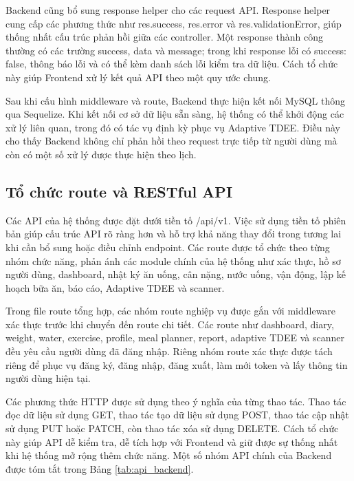 \documentclass[12pt, a4paper]{report}
\begin{document}
Backend cũng bổ sung response helper cho các request API. Response helper cung cấp các phương thức như res.success, res.error và res.validationError, giúp thống nhất cấu trúc phản hồi giữa các controller. Một response thành công thường có các trường success, data và message; trong khi response lỗi có success: false, thông báo lỗi và có thể kèm danh sách lỗi kiểm tra dữ liệu. Cách tổ chức này giúp Frontend xử lý kết quả API theo một quy ước chung.

Sau khi cấu hình middleware và route, Backend thực hiện kết nối MySQL thông qua Sequelize. Khi kết nối cơ sở dữ liệu sẵn sàng, hệ thống có thể khởi động các xử lý liên quan, trong đó có tác vụ định kỳ phục vụ Adaptive TDEE. Điều này cho thấy Backend không chỉ phản hồi theo request trực tiếp từ người dùng mà còn có một số xử lý được thực hiện theo lịch.

\subsection{Tổ chức route và RESTful API}Các API của hệ thống được đặt dưới tiền tố /api/v1. Việc sử dụng tiền tố phiên bản giúp cấu trúc API rõ ràng hơn và hỗ trợ khả năng thay đổi trong tương lai khi cần bổ sung hoặc điều chỉnh endpoint. Các route được tổ chức theo từng nhóm chức năng, phản ánh các module chính của hệ thống như xác thực, hồ sơ người dùng, dashboard, nhật ký ăn uống, cân nặng, nước uống, vận động, lập kế hoạch bữa ăn, báo cáo, Adaptive TDEE và scanner.

Trong file route tổng hợp, các nhóm route nghiệp vụ được gắn với middleware xác thực trước khi chuyển đến route chi tiết. Các route như dashboard, diary, weight, water, exercise, profile, meal planner, report, adaptive TDEE và scanner đều yêu cầu người dùng đã đăng nhập. Riêng nhóm route xác thực được tách riêng để phục vụ đăng ký, đăng nhập, đăng xuất, làm mới token và lấy thông tin người dùng hiện tại.

Các phương thức HTTP được sử dụng theo ý nghĩa của từng thao tác. Thao tác đọc dữ liệu sử dụng GET, thao tác tạo dữ liệu sử dụng POST, thao tác cập nhật sử dụng PUT hoặc PATCH, còn thao tác xóa sử dụng DELETE. Cách tổ chức này giúp API dễ kiểm tra, dễ tích hợp với Frontend và giữ được sự thống nhất khi hệ thống mở rộng thêm chức năng. Một số nhóm API chính của Backend được tóm tắt trong Bảng \ref{tab:api_backend}.
\end{document}
